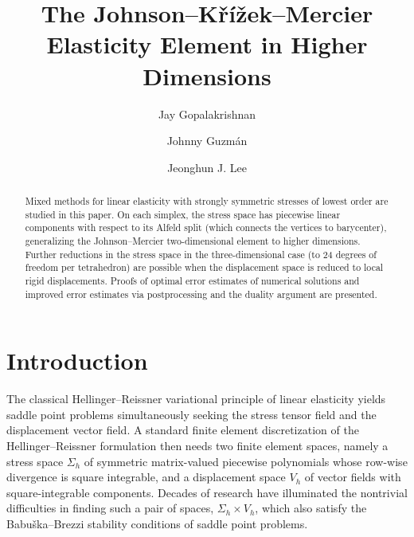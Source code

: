 \documentclass[12pt]{amsart}
\title[JKM elasticity element]{The Johnson--K\v{r}\'{i}\v{z}ek--Mercier Elasticity Element in Higher Dimensions}
\author[]{Jay Gopalakrishnan}
\author[]{Johnny Guzm\'an}
\author[]{Jeonghun J. Lee}
\numberwithin{equation}{section}
\theoremstyle{definition}
\theoremstyle{remark}
\renewcommand{\(}{\bigl(}
\renewcommand{\)}{\bigr)}
\renewcommand\div{\operatorname{div}}
\begin{document}
\maketitle

\begin{abstract}
  Mixed methods for linear elasticity with strongly symmetric stresses of lowest order are studied in this paper. On each simplex, the stress space has piecewise linear components with respect to its Alfeld split (which connects the vertices to barycenter), generalizing the Johnson--Mercier two-dimensional element to higher dimensions. Further reductions in the stress space in the three-dimensional case (to 24 degrees of freedom per tetrahedron) are possible when the displacement space is reduced to local rigid displacements.  Proofs of  optimal error estimates of numerical solutions and improved error estimates via postprocessing and the duality argument are presented.   
\end{abstract}


\section{Introduction}


The classical Hellinger--Reissner variational principle of linear elasticity yields saddle point problems simultaneously seeking  the stress tensor field and the displacement vector field. A standard finite element discretization of the Hellinger--Reissner formulation then needs two finite element spaces, 
namely a stress space 
$\Sigma_h$ of symmetric matrix-valued piecewise polynomials whose row-wise divergence is square integrable,  
and a displacement space $V_h$ of vector fields with square-integrable components.  %
Decades of research have illuminated the 
nontrivial difficulties in finding such a pair of spaces, $\Sigma_h \times V_h$, which also satisfy the Babu\v{s}ka--Brezzi stability conditions of saddle point problems. 
\end{document}

